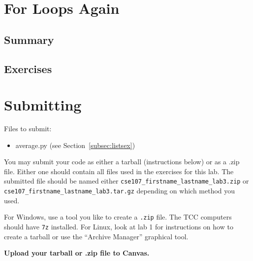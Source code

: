 \documentclass[11pt]{cselabheader}
\begin{document}
\section{For Loops Again}
\subsection{Summary}

\subsection{Exercises}
\label{subsec:forex}


\pagebreak
\section{Submitting}

Files to submit:
\begin{itemize}
  \item average.py (see Section~\ref{subsec:listsex})
\end{itemize}

You may submit your code as either a tarball (instructions below) or as a .zip
file. Either one should contain all files used in the exercises for this lab.
The submitted file should be named either
\texttt{cse107\_firstname\_lastname\_lab3.zip} or
\texttt{cse107\_firstname\_lastname\_lab3.tar.gz} depending on which method you
used.

For Windows, use a tool you like to create a \texttt{.zip} file. The TCC computers should
have \texttt{7z} installed. For Linux, look at lab 1 for instructions on how to
create a tarball or use the ``Archive Manager'' graphical tool.

\begin{center}
  \textbf{Upload your tarball or .zip file to Canvas.}
\end{center}
\end{document}

